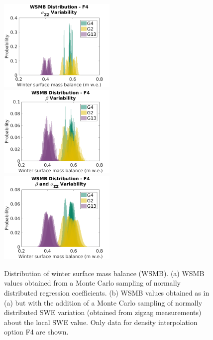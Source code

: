 \documentclass[12pt]{article}
\begin{document}
\begin{figure}[H]
	\centering
	\includegraphics[width =0.5\textwidth]{WSMB_zz.png}\\
	\includegraphics[width =0.5\textwidth]{WSMB_beta.png}\\
	\includegraphics[width =0.5\textwidth]{WSMB_betaNzz.png}\\
	\caption{Distribution of winter surface mass balance (WSMB). (a)  WSMB values obtained from a Monte Carlo sampling of normally distributed regression coefficients. (b) WSMB values obtained as in (a) but with the addition of a Monte Carlo sampling of normally distributed SWE variation (obtained from zigzag measurements) about the local SWE value. Only data for density interpolation option F4 are shown.}
	\label{fig:WSMB_oneDensity}
\end{figure}
\end{document}
